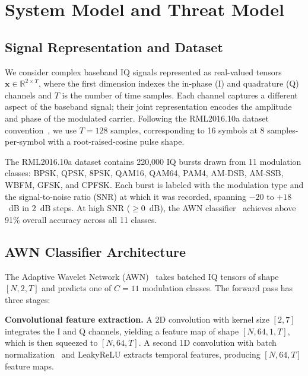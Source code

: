 \section{System Model and Threat Model}
\label{sec:system}

\subsection{Signal Representation and Dataset}

We consider complex baseband IQ signals represented as real-valued tensors
$\mathbf{x} \in \mathbb{R}^{2 \times T}$, where the first dimension indexes
the in-phase (I) and quadrature (Q) channels and $T$ is the number of time
samples. Each channel captures a different aspect of the baseband signal; their
joint representation encodes the amplitude and phase of the modulated carrier.
Following the RML2016.10a dataset convention~\cite{otoole2016rml}, we use
$T = 128$ samples, corresponding to 16 symbols at 8 samples-per-symbol with
a root-raised-cosine pulse shape.

The RML2016.10a dataset contains 220,000 IQ bursts drawn from 11 modulation
classes: BPSK, QPSK, 8PSK, QAM16, QAM64, PAM4, AM-DSB, AM-SSB, WBFM, GFSK,
and CPFSK. Each burst is labeled with the modulation type and the signal-to-noise
ratio (SNR) at which it was recorded, spanning $-20$ to $+18$~dB in 2~dB steps.
At high SNR ($\geq 0$~dB), the AWN classifier~\cite{li2023awn} achieves above
91\% overall accuracy across all 11 classes.

\subsection{AWN Classifier Architecture}

The Adaptive Wavelet Network (AWN)~\cite{li2023awn} takes batched IQ tensors of
shape $[N, 2, T]$ and predicts one of $C = 11$ modulation classes. The forward
pass has three stages:

\textbf{Convolutional feature extraction.} A 2D convolution with kernel size
$[2, 7]$ integrates the I and Q channels, yielding a feature map of shape
$[N, 64, 1, T]$, which is then squeezed to $[N, 64, T]$. A second 1D
convolution with batch normalization~\cite{ioffe2015batch} and LeakyReLU
extracts temporal features, producing $[N, 64, T]$ feature maps.

